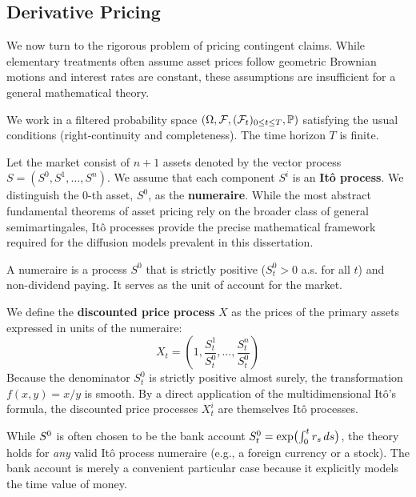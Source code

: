 \subsection{Derivative Pricing}\label{subsec:derivativepricing}

We now turn to the rigorous problem of pricing contingent claims. While elementary treatments often assume asset prices follow geometric Brownian motions and interest rates are constant, these assumptions are insufficient for a general mathematical theory.

We work in a filtered probability space $(\Omega, \mathcal{F}, (\mathcal{F}_t)_{0 \le t \le T}, \mathbb{P})$ satisfying the usual conditions (right-continuity and completeness). The time horizon $T$ is finite.

Let the market consist of $n+1$ assets denoted by the vector process $S = (S^0, S^1, \dots, S^n)$. We assume that each component $S^i$ is an \textbf{Itô process}. We distinguish the $0$-th asset, $S^0$, as the \textbf{numeraire}. While the most abstract fundamental theorems of asset pricing rely on the broader class of general semimartingales, Itô processes provide the precise mathematical framework required for the diffusion models prevalent in this dissertation.


\begin{definition}[Numeraire]
A numeraire is a  process $S^0$ that is strictly positive ($S^0_t > 0$ a.s. for all $t$) and non-dividend paying. It serves as the unit of account for the market.
\end{definition}


We define the \textbf{discounted price process} $X$ as the prices of the primary assets expressed in units of the numeraire:
\begin{equation}
    X_t = \left( 1, \frac{S^1_t}{S^0_t}, \dots, \frac{S^n_t}{S^0_t} \right)
\end{equation}
Because the denominator $S^0_t$ is strictly positive almost surely, the transformation $f(x, y) = x/y$ is smooth. By a direct application of the multidimensional Itô's formula, the discounted price processes $X_t^i$ are themselves Itô processes.

\noindent While $S^{0}$ is often chosen to be the bank account $S^{0}_t = \exp\bigl(\int_0^t r_s\,ds\bigr)$, the theory holds for \textit{any} valid Itô process numeraire (e.g., a foreign currency or a stock). The bank account is merely a convenient particular case because it explicitly models the time value of money.

